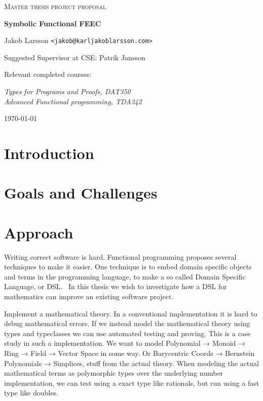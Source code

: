 \documentclass{scrartcl}
\begin{document}
\begin{titlepage}

\centering
{\scshape\LARGE Master thesis project proposal}

\vspace{0.5cm}
{\huge\bfseries Symbolic Functional FEEC}

\vspace{2cm}
{\Large Jakob Larsson \texttt{<jakob@karljakoblarsson.com>}}

\vspace{1.0cm}
{\large Suggested Supervisor at CSE: Patrik Jansson }

\vspace{1.5cm}
{\large Relevant completed courses:}

{\itshape
Types for Programs and Proofs, DAT350 \\
Advanced Functional programming, TDA342 \\
}

\vfill
{\large \today}

\end{titlepage}


%
%

\section{Introduction}
\section{Goals and Challenges}
\section{Approach}

Writing correct software is hard.  Functional programming proposes several
techniques to make it easier.  One technique is to embed domain specific
objects and terms in the programming language, to make a so called Domain
Specific Language, or DSL.~\cite{van2000domain} In this thesis we wish to
investigate how a DSL for mathematics can improve an existing software project.



Implement a mathematical theory.
In a conventional implementation it is hard to debug mathematical errors.
If we instead model the mathematical theory using types and typeclasses we can
use automated testing and proving.
This is a case study in such a implementation.
We want to model Polynomial → Monoid → Ring → Field → Vector Space in some way.
Or Barycentric Coords → Bernstein Polynomials → Simplices, stuff from the
actual theory.
When modeling the actual mathematical terms as polymorphic types over the
underlying number implementation, we can test using a exact type like
rationals, but run using a fast type like doubles.
\end{document}
